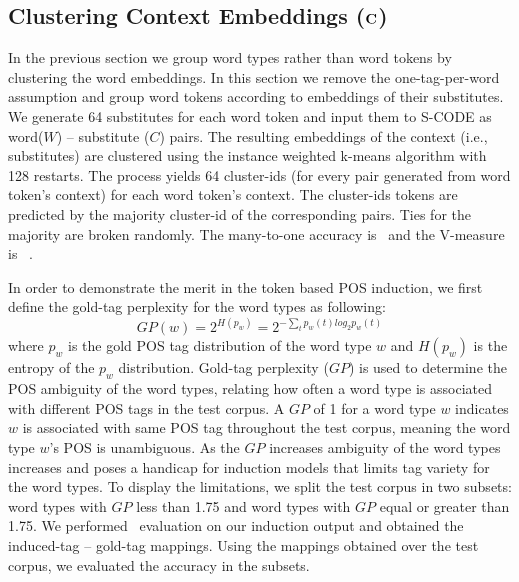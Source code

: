 \subsection{Clustering Context Embeddings (${\bf C}$)}
\label{sec:clustering-c}

In the previous section we group word types rather than word tokens by
clustering the word embeddings.  In this section we remove the
one-tag-per-word assumption and group word tokens according to
embeddings of their substitutes.  We generate 64 substitutes for each
word token and input them to S-CODE as word($W$) -- substitute ($C$)
pairs.  The resulting embeddings of the context (i.e., substitutes)
are clustered using the instance weighted k-means algorithm with 128
restarts.  The process yields 64 cluster-ids (for every pair generated
from word token's context) for each word token's context.  The
cluster-ids tokens are predicted by the majority cluster-id of the
corresponding pairs.  Ties for the majority are broken randomly.  The
many-to-one accuracy is \wsymto\ and the V-measure is \wsyvm\ .

In order to demonstrate the merit in the token based POS induction, we
first define the gold-tag perplexity for the word types as following:
\begin{equation} \label{eq:tag-perp}
GP(w) = 2^{H(p_w)} = 2^{-\sum_{t} p_w(t)log_2 p_w(t)}
\end{equation}
\noindent where $p_w$ is the gold POS tag distribution of the word
type $w$ and $H(p_w)$ is the entropy of the $p_w$ distribution.
Gold-tag perplexity ($GP$) is used to determine the POS ambiguity of
the word types, relating how often a word type is associated with
different POS tags in the test corpus.  A $GP$ of 1 for a word type
$w$ indicates $w$ is associated with same POS tag throughout the test
corpus, meaning the word type $w$'s POS is unambiguous.  As the $GP$
increases ambiguity of the word types increases and poses a handicap
for induction models that limits tag variety for the word types.  To
display the limitations, we split the test corpus in two subsets: word
types with $GP$ less than 1.75 and word types with $GP$ equal or
greater than 1.75.  We performed \mto\ evaluation on our induction
output and obtained the induced-tag -- gold-tag mappings. Using the
mappings obtained over the test corpus, we evaluated the accuracy in
the subsets. 

